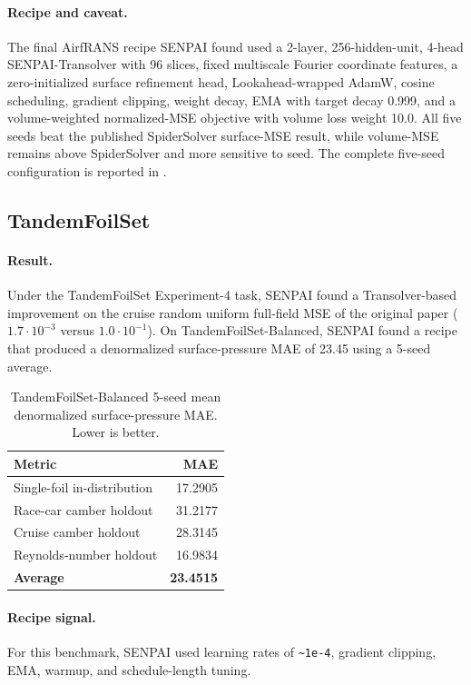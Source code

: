 \documentclass{article}
\begin{document}
\paragraph{Recipe and caveat.}
The final AirfRANS recipe SENPAI found used a 2-layer, 256-hidden-unit, 4-head SENPAI-Transolver with 96 slices, fixed multiscale Fourier coordinate features, a zero-initialized surface refinement head, Lookahead-wrapped AdamW, cosine scheduling, gradient clipping, weight decay, EMA with target decay 0.999, and a volume-weighted normalized-MSE objective with volume loss weight 10.0. All five seeds beat the published SpiderSolver surface-MSE result, while volume-MSE remains above SpiderSolver and more sensitive to seed. The complete five-seed configuration is reported in .

\subsection{TandemFoilSet}

\paragraph{Result.}
Under the TandemFoilSet Experiment-4 task, SENPAI found a Transolver-based improvement on the cruise random uniform full-field MSE of the original paper ($1.7\cdot 10^{-3}$ versus $1.0\cdot 10^{-1}$). On TandemFoilSet-Balanced, SENPAI found a recipe that produced a denormalized surface-pressure MAE of 23.45 using a 5-seed average.

\begin{table}[t]
  \caption{TandemFoilSet-Balanced 5-seed mean denormalized surface-pressure MAE. Lower is better.}
  \label{tab:tandem-balanced}
  \centering
  \small
  \begin{tabular}{@{}lr@{}}
    \toprule
    Metric & MAE \\
    \midrule
    Single-foil in-distribution & 17.2905 \\
    Race-car camber holdout & 31.2177 \\
    Cruise camber holdout & 28.3145 \\
    Reynolds-number holdout & 16.9834 \\
    \textbf{Average} & \textbf{23.4515} \\
    \bottomrule
  \end{tabular}
\end{table}

\paragraph{Recipe signal.}
For this benchmark, SENPAI used learning rates of \texttt{\textasciitilde1e-4}, gradient clipping, EMA, warmup, and schedule-length tuning.
\end{document}
